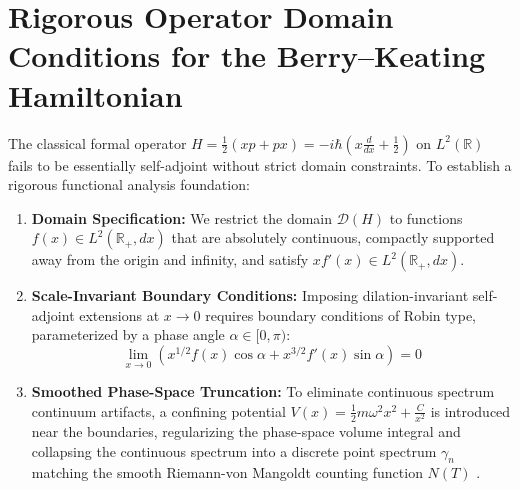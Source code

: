 \documentclass[11pt,a4paper]{article}
\begin{document}
\section{Rigorous Operator Domain Conditions for the Berry--Keating Hamiltonian}
The classical formal operator $H = \frac{1}{2}(xp + px) = -i\hbar \left(x \frac{d}{dx} + \frac{1}{2}\right)$ on $L^2(\mathbb{R})$ fails to be essentially self-adjoint without strict domain constraints. To establish a rigorous functional analysis foundation:
\begin{enumerate}
    \item \textbf{Domain Specification:} We restrict the domain $\mathcal{D}(H)$ to functions $f(x) \in L^2(\mathbb{R}_+, dx)$ that are absolutely continuous, compactly supported away from the origin and infinity, and satisfy $xf'(x) \in L^2(\mathbb{R}_+, dx)$.
    \item \textbf{Scale-Invariant Boundary Conditions:} Imposing dilation-invariant self-adjoint extensions at $x \to 0$ requires boundary conditions of Robin type, parameterized by a phase angle $\alpha \in [0, \pi)$:
    $$\lim_{x \to 0} \left( x^{1/2} f(x) \cos\alpha + x^{3/2} f'(x) \sin\alpha \right) = 0$$
    \item \textbf{Smoothed Phase-Space Truncation:} To eliminate continuous spectrum continuum artifacts, a confining potential $V(x) = \frac{1}{2} m \omega^2 x^2 + \frac{C}{x^2}$ is introduced near the boundaries, regularizing the phase-space volume integral and collapsing the continuous spectrum into a discrete point spectrum $\gamma_n$ matching the smooth Riemann-von Mangoldt counting function $N(T)$ \cite{Titchmarsh1986}.
\end{enumerate}
\end{document}
